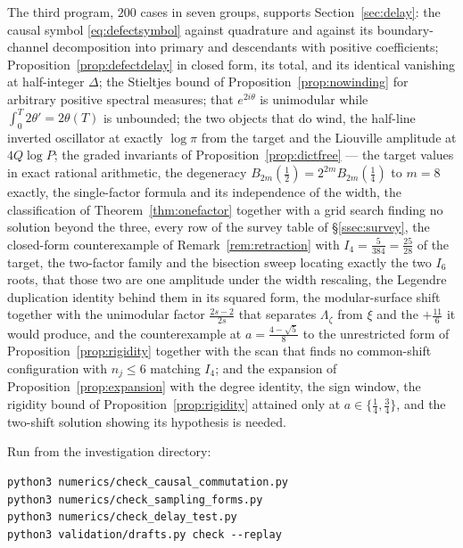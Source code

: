 The third program, $200$ cases in seven groups, supports
Section~\ref{sec:delay}: the causal symbol \eqref{eq:defectsymbol} against
quadrature and against its boundary-channel decomposition into primary and
descendants with positive coefficients; Proposition~\ref{prop:defectdelay} in
closed form, its total, and its identical vanishing at half-integer $\Delta$; the
Stieltjes bound of Proposition~\ref{prop:nowinding} for arbitrary positive
spectral measures; that $e^{2i\theta}$ is unimodular while
$\int_0^T2\theta'=2\theta(T)$ is unbounded; the two objects that do wind, the
half-line inverted oscillator at exactly $\log\pi$ from the target and the
Liouville amplitude at $4Q\log P$; the graded invariants of
Proposition~\ref{prop:dictfree} --- the target values in exact rational
arithmetic, the degeneracy $B_{2m}(\frac12)=2^{2m}B_{2m}(\frac14)$ to $m=8$
exactly, the single-factor formula and its independence of the width, the
classification of Theorem~\ref{thm:onefactor} together with a grid search finding
no solution beyond the three, every row of the survey table of
\S\ref{ssec:survey}, the closed-form counterexample of
Remark~\ref{rem:retraction} with $I_4=\frac5{384}=\frac{25}{28}$ of the target,
the two-factor family and the bisection sweep locating exactly the two $I_6$
roots, that those two are one amplitude under the width rescaling, the Legendre
duplication identity behind them in its squared form, the modular-surface shift
together with the unimodular factor $\frac{2s-2}{2s}$ that separates
$\Lambda_\zeta$ from $\xi$ and the $+\frac{11}6$ it would produce, and the
counterexample at $a=\frac{4-\sqrt5}8$ to the unrestricted form of
Proposition~\ref{prop:rigidity} together with the scan that finds no
common-shift configuration with $n_j\leq6$ matching $I_4$; and the expansion of
Proposition~\ref{prop:expansion} with the degree identity, the sign window, the
rigidity bound of Proposition~\ref{prop:rigidity} attained only at
$a\in\{\frac14,\frac34\}$, and the two-shift solution showing its hypothesis is
needed.

Run from the investigation directory:
\begin{verbatim}
python3 numerics/check_causal_commutation.py
python3 numerics/check_sampling_forms.py
python3 numerics/check_delay_test.py
python3 validation/drafts.py check --replay
\end{verbatim}

